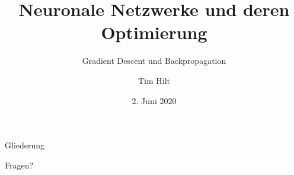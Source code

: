 \documentclass[aspectratio=169, 10pt]{beamer}
\title{Neuronale Netzwerke und deren Optimierung}
\subtitle{Gradient Descent und Backpropagation}
\institute{Hochschule Esslingen --- University of Applied Sciences}
\author{Tim Hilt}
\date{2. Juni 2020}
\begin{document}
\begin{frame}
  \maketitle
\end{frame}

\begin{frame}{Gliederung}
  \tableofcontents
\end{frame}






\begin{frame}[standout]
  Fragen?
\end{frame}

\printbibliography[title=Literaturverzeichnis]
\end{document}
